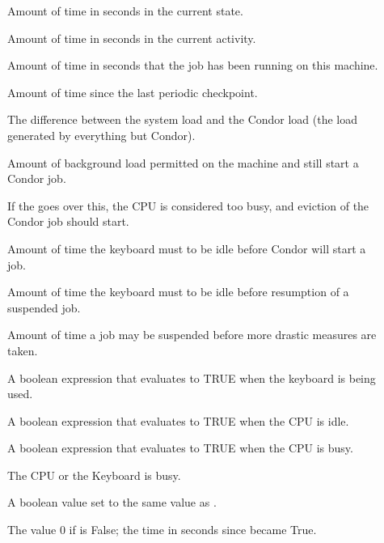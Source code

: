 \begin{description}
  
\item[] Amount of time in seconds in the current state.

\item[] Amount of time in seconds in the current activity. 

\item[] Amount of time in seconds that the job has been
  running on this machine.

\item[] Amount of time since the last periodic checkpoint.

\item[] The difference between the system load and
  the Condor load (the load generated by everything but Condor).

\item[] Amount of background load permitted
  on the machine and still start a Condor job.

\item[] If the  goes over
  this, the CPU is considered too busy, and eviction of the Condor
  job should start. 

\item[] Amount of time the keyboard must to be idle
  before Condor will start a job.

\item[] Amount of time the keyboard must to be idle
  before resumption of a suspended job.

\item[] Amount of time a job may be
  suspended before more drastic measures are taken.

\item[] A boolean expression that evaluates to TRUE
    when the keyboard is being used.

\item[] A boolean expression that evaluates to TRUE
    when the CPU is idle.

\item[] A boolean expression that evaluates
    to TRUE when the CPU is busy.

\item[] The CPU or the Keyboard is busy.

\item[] A boolean value set to the same value as 
    .

\item[] The value 0 if 
    is False; the time in seconds since
     became True.
    
\end{description}


